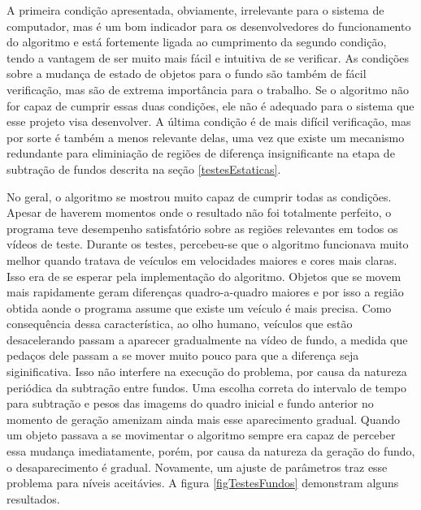 A primeira condição apresentada, obviamente, irrelevante para o sistema de computador, mas é um bom indicador para os desenvolvedores do funcionamento do algoritmo e está fortemente ligada ao cumprimento da segundo condição, tendo a vantagem de ser muito mais fácil e intuitiva de se verificar. As condições sobre a mudança de estado de objetos para o fundo são também de fácil verificação, mas são de extrema importância para o trabalho. Se o algoritmo não for capaz de cumprir essas duas condições, ele não é adequado para o sistema que esse projeto visa desenvolver. A última condição é de mais difícil verificação, mas por sorte é também a menos relevante delas, uma vez que existe um mecanismo redundante para eliminiação de regiões de diferença insignificante na etapa de subtração de fundos descrita na seção \ref{testesEstaticas}.

No geral, o algoritmo se mostrou muito capaz de cumprir todas as condições. Apesar de haverem momentos onde o resultado não foi totalmente perfeito, o programa teve desempenho satisfatório sobre as regiões relevantes em todos os vídeos de teste. Durante os testes, percebeu-se que o algoritmo funcionava muito melhor quando tratava de veículos em velocidades maiores e cores mais claras. Isso era de se esperar pela implementação do algoritmo. Objetos que se movem mais rapidamente geram diferenças quadro-a-quadro maiores e por isso a região obtida aonde o programa assume que existe um veículo é mais precisa. Como consequência dessa característica, ao olho humano, veículos que estão desacelerando passam a aparecer gradualmente na vídeo de fundo, a medida que pedaços dele passam a se mover muito pouco para que a diferença seja siginificativa. Isso não interfere na execução do problema, por causa da natureza periódica da subtração entre fundos. Uma escolha correta do intervalo de tempo para subtração e pesos das imagems do quadro inicial e fundo anterior no momento de geração amenizam ainda mais esse aparecimento gradual. Quando um objeto passava a se movimentar o algoritmo sempre era capaz de perceber essa mudança imediatamente, porém, por causa da natureza da geração do fundo, o desaparecimento é gradual. Novamente, um ajuste de parâmetros traz esse problema para níveis aceitávies. A figura \ref{figTestesFundos} demonstram alguns resultados.

